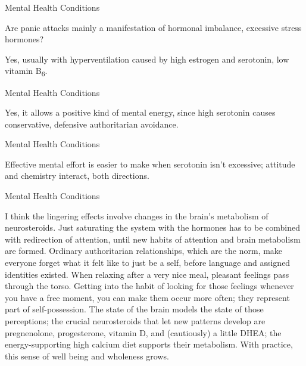 \documentclass[11pt,oneside,openany,extrafontsizes]{memoir}
\begin{document}
\begin{qaexchange}{Mental Health Conditions}

    \begin{question}
        Are panic attacks mainly a manifestation of hormonal imbalance, excessive stress hormones?
    \end{question}

    \begin{answer}
        Yes, usually with hyperventilation caused by high estrogen and serotonin, low vitamin B\textsubscript{6}.
    \end{answer}
\end{qaexchange}

\begin{standalonequote}{Mental Health Conditions}

    \begin{answer}
        Yes, it allows a positive kind of mental energy, since high serotonin causes conservative, defensive authoritarian avoidance.
    \end{answer}
\end{standalonequote}

\begin{standalonequote}{Mental Health Conditions}

    \begin{answer}
        Effective mental effort is easier to make when serotonin isn't excessive; attitude and chemistry interact, both directions.
    \end{answer}
\end{standalonequote}

\begin{standalonequote}{Mental Health Conditions}

    \begin{answer}
      I think the lingering effects involve changes in the brain's metabolism of neurosteroids. Just saturating the system with the hormones has to be combined with redirection of attention, until new habits of attention and brain metabolism are formed. Ordinary authoritarian relationships, which are the norm, make everyone forget what it felt like to just be a self, before language and assigned identities existed. When relaxing after a very nice meal, pleasant feelings pass through the torso. Getting into the habit of looking for those feelings whenever you have a free moment, you can make them occur more often; they represent part of self-possession. The state of the brain models the state of those perceptions; the crucial neurosteroids that let new patterns develop are pregnenolone, progesterone, vitamin D, and (cautiously) a little DHEA; the energy-supporting high calcium diet supports their metabolism. With practice, this sense of well being and wholeness grows.
    \end{answer}
\end{standalonequote}
\end{document}

